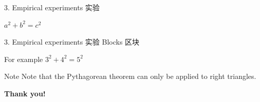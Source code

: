\documentclass[CJKutf8,compress]{beamer}
\begin{document}
\begin{CJK*}{UTF8}{gkai}
\begin{frame}{3. Empirical experiments 实验}
      \begin{theorem}
        $a^2 + b^2 = c^2$
      \end{theorem}
  \end{frame} %

  \begin{frame}{3. Empirical experiments 实验}
    Blocks 区块

      \begin{exampleblock}{For example}
        $3^2 + 4^2 = 5^2$
      \end{exampleblock}

      \begin{alertblock}{Note}
         Note that the Pythagorean theorem can only be applied to right triangles.
      \end{alertblock}
  \end{frame} %

  \begin{frame}
    \begin{center}
      \Huge{\bf{Thank you!}}
    \end{center}
  \end{frame} %


\end{CJK*}
\end{document}
